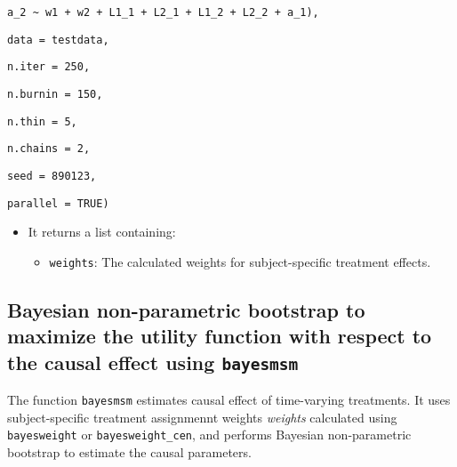 \texttt{a\_2\ \textasciitilde{}\ w1\ +\ w2\ +\ L1\_1\ +\ L2\_1\ +\ L1\_2\ +\ L2\_2\ +\ a\_1),}

\texttt{data\ =\ testdata,}

\texttt{n.iter\ =\ 250,}

\texttt{n.burnin\ =\ 150,}

\texttt{n.thin\ =\ 5,}

\texttt{n.chains\ =\ 2,}

\texttt{seed\ =\ 890123,}

\texttt{parallel\ =\ TRUE)}

\begin{itemize}
\tightlist
\item
  It returns a list containing:

  \begin{itemize}
  \tightlist
  \item
    \texttt{weights}: The calculated weights for subject-specific treatment
    effects.
  \end{itemize}
\end{itemize}

\subsection{\texorpdfstring{Bayesian non-parametric bootstrap to maximize the utility function with respect to the causal effect using \texttt{bayesmsm}}{Bayesian non-parametric bootstrap to maximize the utility function with respect to the causal effect using bayesmsm}}\label{bayesian-non-parametric-bootstrap-to-maximize-the-utility-function-with-respect-to-the-causal-effect-using-bayesmsm}

The function \texttt{bayesmsm} estimates causal effect of time-varying
treatments. It uses subject-specific treatment assignmennt weights
\emph{weights} calculated using \texttt{bayesweight} or \texttt{bayesweight\_cen}, and
performs Bayesian non-parametric bootstrap to estimate the causal
parameters.

